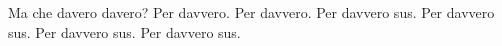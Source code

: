 \documentclass{article}
\begin{document}
Ma che davero davero?
Per davvero.
Per davvero.
Per davvero sus.
Per davvero sus.
Per davvero sus.
Per davvero sus.
\end{document}
